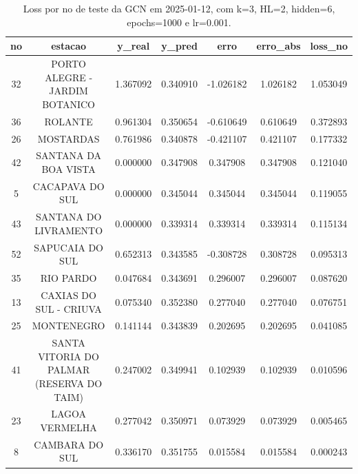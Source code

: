 \begin{table}[h]
\centering
\caption{Loss por no de teste da GCN em 2025-01-12, com k=3, HL=2, hidden=6, epochs=1000 e lr=0.001.}
\label{tab:gcn_loss_k3_hl2_h6_e1000_d20250112}
\begin{tabular}{ccccccc}
\toprule
no & estacao & y\_real & y\_pred & erro & erro\_abs & loss\_no \\
\midrule
32 & PORTO ALEGRE - JARDIM BOTANICO & 1.367092 & 0.340910 & -1.026182 & 1.026182 & 1.053049 \\
36 & ROLANTE & 0.961304 & 0.350654 & -0.610649 & 0.610649 & 0.372893 \\
26 & MOSTARDAS & 0.761986 & 0.340878 & -0.421107 & 0.421107 & 0.177332 \\
42 & SANTANA DA BOA VISTA & 0.000000 & 0.347908 & 0.347908 & 0.347908 & 0.121040 \\
5 & CACAPAVA DO SUL & 0.000000 & 0.345044 & 0.345044 & 0.345044 & 0.119055 \\
43 & SANTANA DO LIVRAMENTO & 0.000000 & 0.339314 & 0.339314 & 0.339314 & 0.115134 \\
52 & SAPUCAIA DO SUL & 0.652313 & 0.343585 & -0.308728 & 0.308728 & 0.095313 \\
35 & RIO PARDO & 0.047684 & 0.343691 & 0.296007 & 0.296007 & 0.087620 \\
13 & CAXIAS DO SUL - CRIUVA & 0.075340 & 0.352380 & 0.277040 & 0.277040 & 0.076751 \\
25 & MONTENEGRO & 0.141144 & 0.343839 & 0.202695 & 0.202695 & 0.041085 \\
41 & SANTA VITORIA DO PALMAR (RESERVA DO TAIM) & 0.247002 & 0.349941 & 0.102939 & 0.102939 & 0.010596 \\
23 & LAGOA VERMELHA & 0.277042 & 0.350971 & 0.073929 & 0.073929 & 0.005465 \\
8 & CAMBARA DO SUL & 0.336170 & 0.351755 & 0.015584 & 0.015584 & 0.000243 \\
\bottomrule
\end{tabular}
\end{table}
